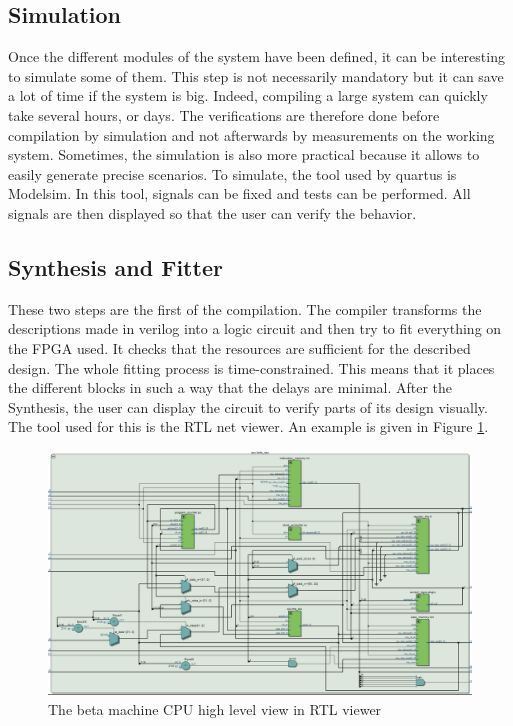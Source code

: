\subsection{Simulation}

Once the different modules of the system have been defined, it can be interesting to simulate some 
of them. This step is not necessarily mandatory but it can save a lot of time if the system is big. 
Indeed, compiling a large system can quickly take several hours, or days. The verifications are 
therefore done before compilation by simulation and not afterwards by measurements on the working 
system. 
Sometimes, the simulation is also more practical because it allows to easily generate precise 
scenarios. To simulate, the tool used by quartus is Modelsim. In this tool, signals can be fixed 
and tests can be performed. All signals are then displayed so that the user can verify the 
behavior.

\subsection{Synthesis and Fitter}

These two steps are the first of the compilation. The compiler transforms the descriptions made
 in verilog into a logic circuit and then try to fit everything on the FPGA used. It checks that 
 the resources are sufficient for the described design. The whole fitting process is 
 time-constrained. This means that it places the different blocks in such a way that the delays 
 are minimal. After the Synthesis, the user can display the circuit to verify parts of its design
 visually. The tool used for this is the RTL net viewer. An example is given in Figure 
 \ref{fig:tools/rtl}.

 \begin{figure}[H]
    \centering
    \includegraphics[width=\linewidth]{Chapter2-FPGA_Flow/res/rtl.PNG}
    \caption{The beta machine CPU high level view in RTL viewer}
    \label{fig:tools/rtl}
\end{figure}

